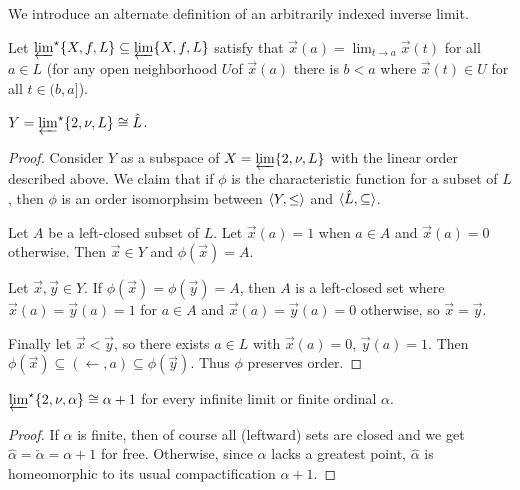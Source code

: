 \documentclass[11pt]{article}
\newcommand{\vect}{\vec}
\begin{document}
  We introduce an alternate definition of an arbitrarily indexed
  inverse limit.

  \begin{definition}
    Let \(\varprojlim^\star\{X,f,L\}\subseteq\varprojlim\{X,f,L\}\) satisfy
    that \(\vect x(a)=\lim_{t\to a}\vect x(t)\) for all \(a\in L\)
    (for any open neighborhood
    \(U\)of \(\vect x(a)\) there is \(b<a\) where \(\vect x(t)\in U\)
    for all \(t\in(b,a]\)).
  \end{definition}

  \begin{theorem}
    \(Y=\varprojlim^\star \{2, \nu, L\}\cong \hat L\).
  \end{theorem}

  \begin{proof}
    Consider \(Y\) as a subspace of \(X=\varprojlim \{2, \nu, L\}\) with
    the linear order described above. We claim that if \(\phi\) is the
    characteristic function for a subset of \(L\), then \(\phi\)
    is an order isomorphsim between \(\langle Y,\leq\rangle\) and
    \(\langle\hat L,\subseteq\rangle\).

    Let \(A\) be a left-closed subset of \(L\). Let \(\vect x(a)=1\) when
    \(a\in A\) and \(\vect x(a)=0\) otherwise. Then \(\vect x\in Y\) and
    \(\phi(\vect x)=A\).

    Let \(\vect x,\vect y\in Y\). If
    \(\phi(\vect x)=\phi(\vect y)=A\), then \(A\) is a
    left-closed set where \(\vect x(a)=\vect y(a)=1\) for \(a\in A\)
    and \(\vect x(a)=\vect y(a)=0\) otherwise, so \(\vect x=\vect y\).

    Finally let \(\vect x<\vect y\), so there exists \(a\in L\) with
    \(\vect x(a)=0\), \(\vect y(a)=1\). Then
    \(
      \phi(\vect x)
        \subseteq
      (\leftarrow,a)
        \subseteq
      \phi(\vect y)
    \). Thus \(\phi\) preserves order.
  \end{proof}

  \begin{corollary}
    \(
      \varprojlim^\star \{2, \nu, \alpha\}
      \cong
      \alpha+1
    \)
    for every infinite limit or finite ordinal \(\alpha\).
  \end{corollary}

  \begin{proof}
    If \(\alpha\) is finite, then of course all (leftward) sets are
    closed and we get \(\hat\alpha=\check\alpha=\alpha+1\) for free.
    Otherwise, since \(\alpha\) lacks a greatest point, \(\hat\alpha\)
    is homeomorphic to its usual compactification \(\alpha+1\).
  \end{proof}
\end{document}
